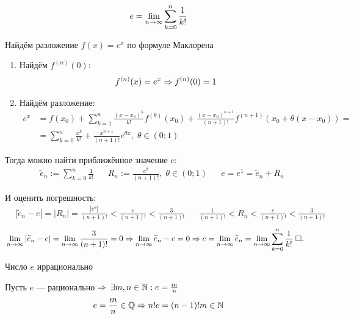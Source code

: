 \documentclass{article}
\begin{document}

\theorem
\begin{align*}
	e=\lim\limits_{n\to\infty}\sum_{k=0}^{n}\frac{1}{k!}
\end{align*}

\proof

Найдём разложение $f(x)=e^{x}$ по формуле Маклорена

\begin{enumerate}
	\item{}Найдём $f^{(n)}(0)$:
	\begin{align*}
		f^{(n)}(x)=e^{x}\Rightarrow f^{(n)}(0)=1
	\end{align*}
	\item{}Найдём разложение:
	\begin{align*}
		e^{x} & =f(x_0)+\sum_{k=1}^{n}\frac{(x-x_0)^{k}}{k!}f^{(k)}(x_0)+\frac{(x-x_0)^{n+1}}{(n+1)!}f^{(n+1)}(x_0+\theta(x-x_0))= \\
		      & =\sum_{k=0}^{n}\frac{x^{k}}{k!}+\frac{x^{n+1}}{(n+1)!}e^{\theta x},\;\theta\in(0;1)
	\end{align*}
\end{enumerate}

\newcommand\ep{\widetilde{e}}

Тогда можно найти приближённое значение $e$:
\begin{align}
	 & \ep_{n}:=\sum_{k=0}^{n}\frac{1}{k!} &  & R_{n}:=\frac{e^{\theta}}{(n+1)!},\;\theta\in(0;1) &  & e=e^{1}=\ep_{n}+R_{n}\label{68:taylor_e}
\end{align}

И оценить погрешность:
\begin{align}
	 & |\ep_{n}-e|=|R_{n}|=\frac{|e^{\theta}|}{(n+1)!}<\frac{e}{(n+1)!}<\frac{3}{(n+1)!} &  & \frac{1}{(n+1)!}<R_{n}<\frac{e}{(n+1)!}<\frac{3}{(n+1)!}\label{68:rlims}
\end{align}
\begin{align*}
	 & \slimty|\ep_{n}-e|=\slimty\frac{3}{(n+1)!}=0 \Rarr \slimty \ep_{n}-e=0\Rarr e=\slimty\ep_{n}=\slimty\sum_{k=0}^{n}\frac{1}{k!}\qed
\end{align*}

\pagebreak

\theorem

Число $e$ иррационально

\proof

Пусть $e$ --- рационально $\Rightarrow$ $\exists m,n\in\mathbb{N}:e=\frac{m}{n}$
\begin{align*}
	e=\frac{m}{n}\in\mathbb{Q}\Rightarrow n!e=(n-1)!m\in\mathbb{N}
\end{align*}
\end{document}
